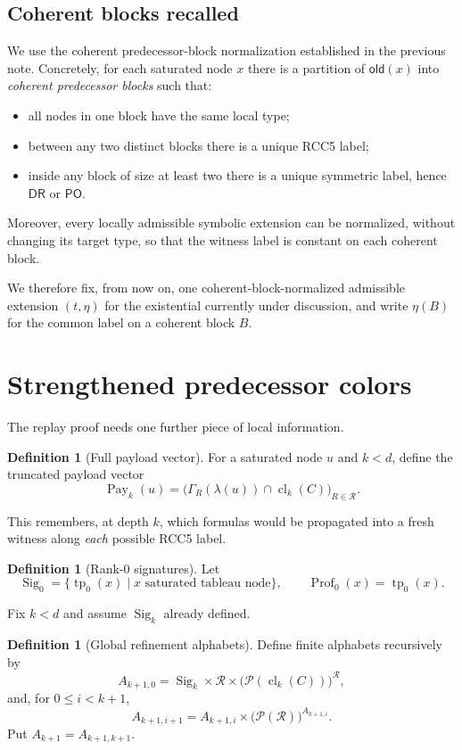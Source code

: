 \documentclass[11pt]{article}
\theoremstyle{definition}
\newtheorem{definition}[theorem]{Definition}
\newcommand{\Roles}{\mathcal{R}}
\newcommand{\DR}{\mathsf{DR}}
\newcommand{\PO}{\mathsf{PO}}
\newcommand{\cld}[2]{\operatorname{cl}_{#1}(#2)}
\newcommand{\tp}{\operatorname{tp}}
\newcommand{\Prof}{\operatorname{Prof}}
\newcommand{\older}{\mathsf{old}}
\newcommand{\Sig}{\operatorname{Sig}}
\newcommand{\Pay}{\operatorname{Pay}}
\begin{document}
\subsection*{Coherent blocks recalled}

We use the coherent predecessor-block normalization established in the previous note. Concretely, for each saturated node $x$ there is a partition of $\older(x)$ into \emph{coherent predecessor blocks} such that:
\begin{itemize}
  \item all nodes in one block have the same local type;
  \item between any two distinct blocks there is a unique RCC5 label;
  \item inside any block of size at least two there is a unique symmetric label, hence $\DR$ or $\PO$.
\end{itemize}
Moreover, every locally admissible symbolic extension can be normalized, without changing its target type, so that the witness label is constant on each coherent block.

We therefore fix, from now on, one coherent-block-normalized admissible extension $(t,\eta)$ for the existential currently under discussion, and write $\eta(B)$ for the common label on a coherent block $B$.

\section{Strengthened predecessor colors}

The replay proof needs one further piece of local information.

\begin{definition}[Full payload vector]
For a saturated node $u$ and $k<d$, define the truncated payload vector
\[
\Pay_k(u)=\bigl(\Gamma_R(\lambda(u))\cap \cld{k}{C}\bigr)_{R\in\Roles}.
\]
\end{definition}

This remembers, at depth $k$, which formulas would be propagated into a fresh witness along \emph{each} possible RCC5 label.

\begin{definition}[Rank-0 signatures]
Let
\[
\Sig_0=\{\tp_0(x)\mid x\text{ saturated tableau node}\},
\qquad
\Prof_0(x)=\tp_0(x).
\]
\end{definition}

Fix $k<d$ and assume $\Sig_k$ already defined.

\begin{definition}[Global refinement alphabets]
Define finite alphabets recursively by
\[
A_{k+1,0}=\Sig_k\times \Roles\times \bigl(\mathcal P(\cld{k}{C})\bigr)^{\Roles},
\]
and, for $0\le i<k+1$,
\[
A_{k+1,i+1}=A_{k+1,i}\times \bigl(\mathcal P(\Roles)\bigr)^{A_{k+1,i}}.
\]
Put $A_{k+1}=A_{k+1,k+1}$.
\end{definition}
\end{document}
